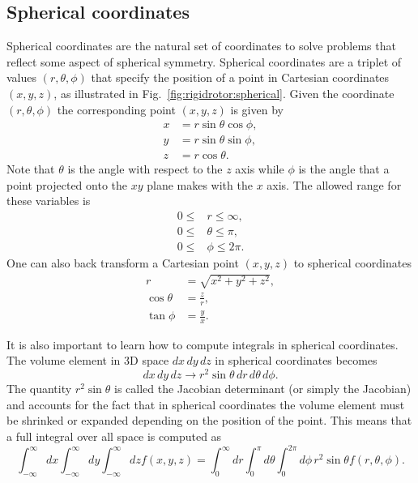 \documentclass[../Main/chem331-notes.tex]{subfiles}
\begin{document}
\subsection{Spherical coordinates}
Spherical coordinates are the natural set of coordinates to solve problems that reflect some aspect of spherical symmetry.
Spherical coordinates are a triplet of values $(r,\theta,\phi)$ that specify the position of a point in Cartesian coordinates $(x,y,z)$, as illustrated in Fig.~\ref{fig:rigidrotor:spherical}.
Given the coordinate $(r,\theta,\phi)$ the corresponding point $(x,y,z)$ is given by
\begin{align}
x & =  r \sin \theta \cos \phi, \\
y & =  r \sin \theta \sin \phi, \\
z & =  r \cos \theta.
\end{align}
Note that $\theta$ is the angle with respect to the $z$ axis while $\phi$ is the angle that a point projected onto the $xy$ plane makes with the $x$ axis.
The allowed range for these variables is
\begin{align}
0 \leq & r \leq \infty, \\
0 \leq  & \theta \leq \pi, \\
0 \leq  & \phi \leq 2 \pi.
\end{align}
One can also back transform a Cartesian point $(x,y,z)$ to spherical coordinates
\begin{align}
r & =  \sqrt{x^2 + y^2 + z^2}, \\
\cos \theta & = \frac{z}{r}, \\
\tan \phi & = \frac{y}{x}.
\end{align}

It is also important to learn how to compute integrals in spherical coordinates.
The volume element in 3D space $dx \, dy \, dz$ in spherical coordinates becomes
\begin{equation}
dx \, dy \, dz \rightarrow  r^2 \sin \theta \, dr \, d\theta \, d\phi.
\end{equation}
The quantity $r^2 \sin \theta$ is called the Jacobian determinant (or simply the Jacobian) and accounts for the fact that in spherical coordinates the volume element must be shrinked or expanded depending on the position of the point.
This means that a full integral over all space is computed as
\begin{equation}
\int_{-\infty}^{\infty} dx
\int_{-\infty}^{\infty} dy
\int_{-\infty}^{\infty} dz f(x,y,z) = 
\int_{0}^{\infty} dr
\int_{0}^{\pi} d\theta
\int_{0}^{2\pi} d\phi \,r^2 \sin \theta f(r,\theta,\phi).
\end{equation}
\end{document}
